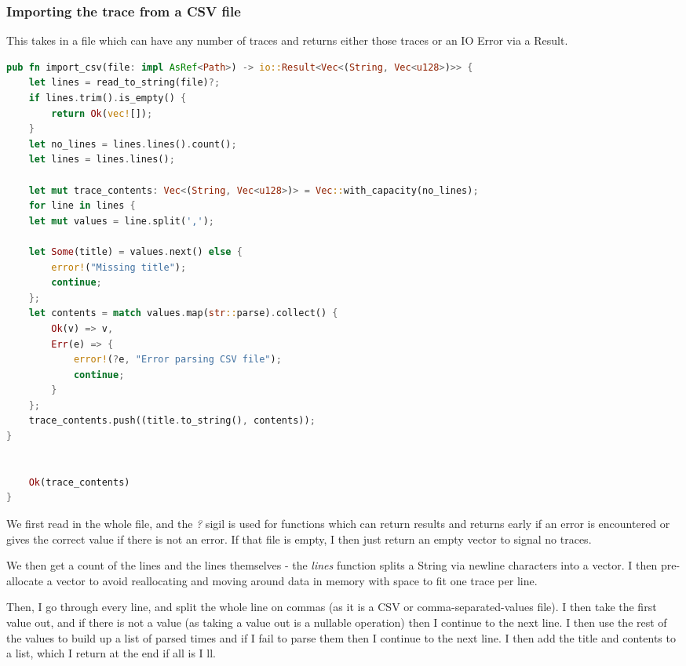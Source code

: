 \documentclass{article}
\begin{document}
\begin{multicols*}{2}
\subsubsection{Importing the trace from a CSV file}
This takes in a file which can have any number of traces and returns either those traces or an IO Error via a Result.
\begin{lstlisting}[language=Rust]
pub fn import_csv(file: impl AsRef<Path>) -> io::Result<Vec<(String, Vec<u128>)>> {
	let lines = read_to_string(file)?;
	if lines.trim().is_empty() {
		return Ok(vec![]);
	}
	let no_lines = lines.lines().count();
	let lines = lines.lines();
	
	let mut trace_contents: Vec<(String, Vec<u128>)> = Vec::with_capacity(no_lines);
    for line in lines {
	let mut values = line.split(',');
	
	let Some(title) = values.next() else {
		error!("Missing title");
		continue;
	};
	let contents = match values.map(str::parse).collect() {
		Ok(v) => v,
		Err(e) => {
			error!(?e, "Error parsing CSV file");
			continue;
		}
	};
	trace_contents.push((title.to_string(), contents));
}

	
	Ok(trace_contents)
}
\end{lstlisting}
We first read in the whole file, and the \textit{?} sigil is used for functions which can return results and returns early if an error is encountered or gives the correct value if there is not an error. If that file is empty, I then just return an empty vector to signal no traces.

We then get a count of the lines and the lines themselves - the \textit{lines} function splits a String via newline characters into a vector. I then pre-allocate a vector to avoid reallocating and moving around data in memory with space to fit one trace per line.

Then, I go through every line, and split the whole line on commas (as it is a CSV or comma-separated-values file). I then take the first value out, and if there is not a value (as taking a value out is a nullable operation) then I continue to the next line. I then use the rest of the values to build up a list of parsed times and if I fail to parse them then I continue to the next line. I then add the title and contents to a list, which I return at the end if all is I ll.

\end{multicols*}
\newpage
\end{document}
